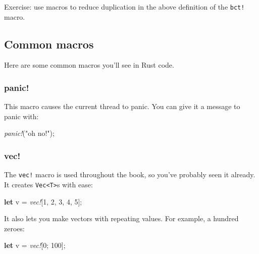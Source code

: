 \documentclass[a4paper,]{book}
\newenvironment{Shaded}{\begin{snugshade}}{\end{snugshade}}
\newcommand{\KeywordTok}[1]{\textcolor[rgb]{0.13,0.29,0.53}{\textbf{{#1}}}}
\newcommand{\DecValTok}[1]{\textcolor[rgb]{0.00,0.00,0.81}{{#1}}}
\newcommand{\StringTok}[1]{\textcolor[rgb]{0.31,0.60,0.02}{{#1}}}
\newcommand{\PreprocessorTok}[1]{\textcolor[rgb]{0.56,0.35,0.01}{\textit{{#1}}}}
\newcommand{\NormalTok}[1]{{#1}}
\begin{document}
Exercise: use macros to reduce duplication in the above definition of
the \texttt{bct!} macro.

\subsection{Common macros}\label{common-macros}

Here are some common macros you'll see in Rust code.

\subsubsection{panic!}\label{panic}

This macro causes the current thread to panic. You can give it a message
to panic with:

\begin{Shaded}
\begin{Highlighting}[]
\PreprocessorTok{panic!}\NormalTok{(}\StringTok{"oh no!"}\NormalTok{);}
\end{Highlighting}
\end{Shaded}

\subsubsection{vec!}\label{vec}

The \texttt{vec!} macro is used throughout the book, so you've probably
seen it already. It creates \texttt{Vec\textless{}T\textgreater{}}s with
ease:

\begin{Shaded}
\begin{Highlighting}[]
\KeywordTok{let} \NormalTok{v = }\PreprocessorTok{vec!}\NormalTok{[}\DecValTok{1}\NormalTok{, }\DecValTok{2}\NormalTok{, }\DecValTok{3}\NormalTok{, }\DecValTok{4}\NormalTok{, }\DecValTok{5}\NormalTok{];}
\end{Highlighting}
\end{Shaded}

It also lets you make vectors with repeating values. For example, a
hundred zeroes:

\begin{Shaded}
\begin{Highlighting}[]
\KeywordTok{let} \NormalTok{v = }\PreprocessorTok{vec!}\NormalTok{[}\DecValTok{0}\NormalTok{; }\DecValTok{100}\NormalTok{];}
\end{Highlighting}
\end{Shaded}
\end{document}
